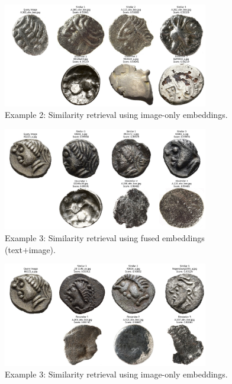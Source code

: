 \documentclass[nolibertine, english, algorithm, nomencl, minted]{ttlab-qualify}
\begin{document}
\begin{figure}[H]
    \centering
    \includegraphics[width=0.8\textwidth]{static/image_similarity_example_2.png}
    \caption{Example 2: Similarity retrieval using image-only embeddings.}
    \label{fig:image_similarity2}
\end{figure}

\begin{figure}[H]
    \centering
    \includegraphics[width=0.8\textwidth]{static/fused_similarity_example_3.png}
    \caption{Example 3: Similarity retrieval using fused embeddings (text+image).}
    \label{fig:fused_similarity3}
\end{figure}

\begin{figure}[H]
    \centering
    \includegraphics[width=0.8\textwidth]{static/image_similarity_example_3.png}
    \caption{Example 3: Similarity retrieval using image-only embeddings.}
    \label{fig:image_similarity3}
\end{figure}
\end{document}
